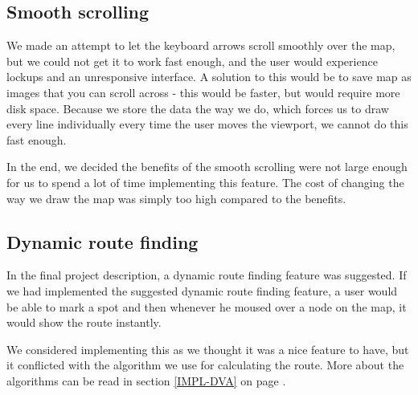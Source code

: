 \subsection{Smooth scrolling}
\label{UIA-NI-SS}
We made an attempt to let the keyboard arrows scroll smoothly over the map, but
we could not get it to work fast enough, and the user would experience
lockups and an unresponsive interface. A solution to this would
be to save map as images that you can scroll across - this would be faster, but
would require more disk space. Because we store the data the way we do, which 
forces us to draw every line individually every time the user moves the viewport, 
we cannot do this fast enough.

In the end, we decided the benefits of the smooth scrolling were not large enough
for us to spend a lot of time implementing this feature. The cost of changing
the way we draw the map was simply too high compared to the benefits.

\subsection{Dynamic route finding}
\label{UIA-NI-DRF}
In the final project description, a dynamic route finding feature was
suggested. If we had implemented the suggested dynamic route finding feature, a
user would be able to mark a spot and then whenever he moused over a node on the
map, it would show the route instantly.

We considered implementing this as we thought it was a
nice feature to have, but it conflicted with the algorithm we use for
calculating the route. More about the algorithms can be read in section
\ref{IMPL-DVA}  on page \pageref{IMPL-DVA}.
